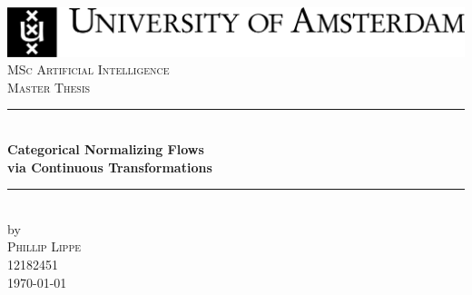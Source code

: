 \documentclass[11pt]{article}
\newcommand{\red}[1]{{\color{red}{#1}}}
\begin{document}
\begin{titlepage} 

\newcommand{\HRule}{\rule{\linewidth}{0.5mm}} %
\center %
 

\includegraphics[width=0.8\linewidth]{figures/uvaENG.jpg}\\[2.5cm]
\textsc{\Large MSc Artificial Intelligence}\\[0.2cm]
\textsc{\Large Master Thesis}\\[0.5cm] 


\HRule \\[0.4cm]
{ \huge \bfseries Categorical Normalizing Flows\\ via Continuous Transformations}\\[0.4cm] %
\HRule \\[0.5cm]
 

by\\[0.2cm]
\textsc{\Large Phillip Lippe}\\[0.2cm] %
12182451\\[1cm]



{\Large \today}\\[1cm] %


\end{titlepage}
\end{document}
